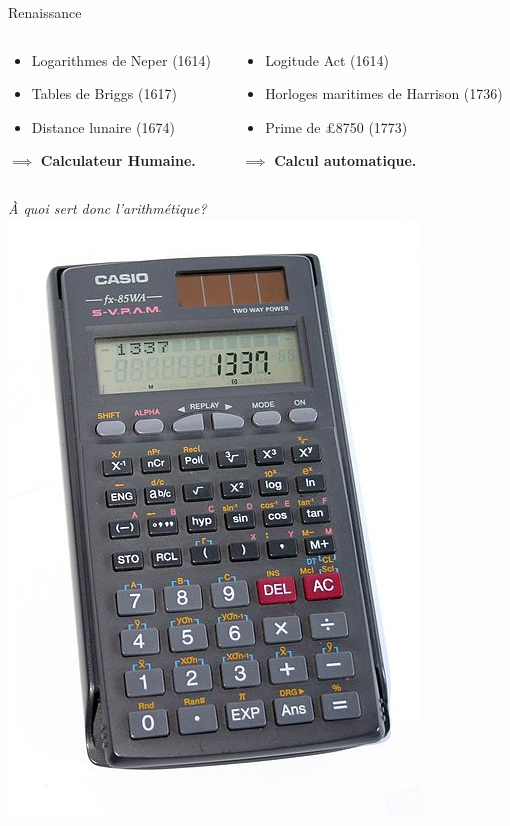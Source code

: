 \begin{frame}{Renaissance}
\begin{columns}
\begin{column}{0.40\linewidth}
	\end{column}
\end{columns}
\begin{columns}
	\begin{column}{0.49\linewidth}
		\begin{itemize}
			\item Logarithmes de Neper (1614)
			\item Tables de Briggs (1617)
			\item Distance lunaire (1674)
		\end{itemize}
		$\implies$ \textbf{Calculateur Humaine.}
	\end{column}
	\begin{column}{0.49\linewidth}
		\begin{itemize}
			\item Logitude Act (1614) 
			\item Horloges maritimes de Harrison (1736)
			\item Prime de £8750 (1773)
		\end{itemize}
		$\implies$ \textbf{Calcul automatique.}
	\end{column}
\end{columns}
\end{frame}
\begin{frame}
\centering
\huge \emph{À quoi sert donc l'arithmétique?}
\vfill
\centering
\includegraphics[height=0.5\paperheight]{../resources/illustrations/calculator} \\
\vfill
\end{frame}
